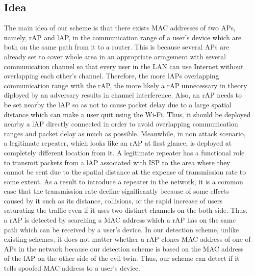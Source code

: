 \documentclass[conference]{IEEEtran}
\begin{document}
\subsection{Idea}
The main idea of our scheme is that there exists MAC addresses of two APs, namely, rAP and lAP, in the communication range of a user's device which are both on the same path from it to a router.
This is because several APs are already set to cover whole area in an appropriate arragement with several communication channel so that every user in the LAN can use Internet without overlapping each other's channel.
Therefore, the more lAPs overlapping communication range with the rAP, the more likely a rAP unnecessary in theory diployed by an adversary results in channel interference.
Also, an rAP needs to be set nearby the lAP so as not to cause packet delay due to a large spatial distance which can make a user quit using the Wi-Fi.
Thus, it should be deployed nearby a lAP directly connected in order to avoid overlapping communication ranges and packet delay as much as possible.
Meanwhile, in non attack scenario, a legitimate repeater, which looks like an rAP at first glance, is deployed at completely different location from it.
A legitimate repeater has a functional role to transmit packets from a lAP associated with ISP to the area where they cannot be sent due to the spatial distance at the expense of transmission rate to some extent.
As a result to introduce a repeater in the network, it is a common case that the transmission rate decline significantly because of some effects caused by it such as its distance, collisions, or the rapid increase of users saturating the traffic even if it uses two distinct channels on the both side. 
Thus, a rAP is detected by searching a MAC address which a rAP has on the same path which can be received by a user's device.
In our detection scheme, unlike existing schemes, it does not matter whether a rAP clones MAC address of one of APs in the network because our detection scheme is based on the MAC address of the lAP on the other side of the evil twin.
Thus, our scheme can detect if it tells spoofed MAC address to a user's device.
\end{document}

